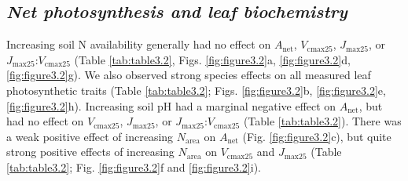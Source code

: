     \newpage
    \subsection{\textit{Net photosynthesis and leaf biochemistry}}

    Increasing soil N availability generally had no effect on $A_\mathrm{net}$, $V_\mathrm{cmax25}$, $J_\mathrm{max25}$, or $J_\mathrm{max25}$:$V_\mathrm{cmax25}$ (Table \ref{tab:table3.2}, Figs. \ref{fig:figure3.2}a, \ref{fig:figure3.2}d, \ref{fig:figure3.2}g). We also observed strong species effects on all measured leaf photosynthetic traits (Table \ref{tab:table3.2}; Figs. \ref{fig:figure3.2}b, \ref{fig:figure3.2}e, \ref{fig:figure3.2}h). Increasing soil pH had a marginal negative effect on $A_\mathrm{net}$, but had no effect on $V_\mathrm{cmax25}$, $J_\mathrm{max25}$, or $J_\mathrm{max25}$:$V_\mathrm{cmax25}$ (Table \ref{tab:table3.2}). There was a weak positive effect of increasing $N_\mathrm{area}$ on $A_\mathrm{net}$ (Fig. \ref{fig:figure3.2}c), but quite strong positive effects of increasing $N_\mathrm{area}$ on $V_\mathrm{cmax25}$ and $J_\mathrm{max25}$ (Table \ref{tab:table3.2}; Fig. \ref{fig:figure3.2}f and \ref{fig:figure3.2}i).
    \clearpage
    

